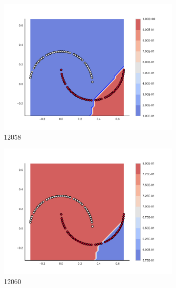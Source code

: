 \begin{figure}[h]
\begin{subfigure}[b]{0.09\textwidth}
    \includegraphics[clip, trim=2.35cm 1.75cm 4.5cm 0cm,width=\textwidth]{img/convergence/12058.pdf}
    \caption{12058}
    \label{fig:convergence_12058}
\end{subfigure}
%
\begin{subfigure}[b]{0.09\textwidth}
    \includegraphics[clip, trim=2.35cm 1.75cm 4.5cm 0cm,width=\textwidth]{img/convergence/12060.pdf}
    \caption{12060}
    \label{fig:convergence_12060}
\end{subfigure}
%
\begin{subfigure}[b]{0.09\textwidth}

\end{subfigure}
\end{figure}
